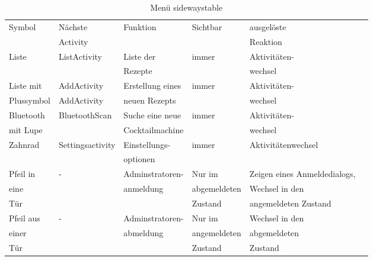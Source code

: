 \begin{table}[]
	\centering
	\caption{Menü sidewaystable}
	
	\begin{tabular}{|l|l|l|l|l|l|}
		\hline
		Symbol  & Nächste   & Funktion  & Sichtbar  & ausgelöste  \\
		   &  Activity  &   &   &  Reaktion \\ \hline
		Liste  & ListActivity  & Liste der    & immer  & Aktivitäten- \\ 
		   &    &   Rezepte  &    & wechsel  \\ \hline
		Liste mit   & AddActivity  & Erstellung eines  & immer  & Aktivitäten- \\ 
		Plussymbol  & AddActivity  &  neuen Rezepts  &   & wechsel \\ \hline
		Bluetooth   & BluetoothScan  & Suche eine neue   & immer  & Aktivitäten- \\
		 mit Lupe  &   &  Cocktailmachine  &    &  wechsel \\ \hline
		Zahnrad  & Settingsactivity  & Einstellungs-  & immer  & Aktivitätenwechsel \\   &    & optionen   &    &   \\ \hline
		Pfeil in   & -  & Adminstratoren-  & Nur im   & Zeigen eines Anmeldedialogs, \\
		eine   &  &anmeldung   & abgemeldeten   & Wechsel in den  \\ 
		Tür   &  &    &  Zustand  & angemeldeten Zustand \\ \hline
		Pfeil aus   & -  & Adminstratoren-  & Nur im  & Wechsel in den \\  
		einer   &   &abmeldung    &  angemeldeten   & abgemeldeten  \\
		 Tür  &   &    &   Zustand  &  Zustand \\ \hline
	\end{tabular}
	
\end{table}

